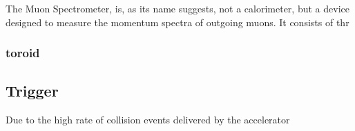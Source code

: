 The Muon Spectrometer, is, as its name suggests, not a calorimeter, but a device designed to measure the momentum spectra of outgoing muons. It consists of thr 


\subsubsection{toroid} \label{sec:toroid} 




\subsection{Trigger} \label{sec:Trigger}
Due to the high rate of collision events delivered by the accelerator 
